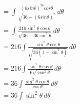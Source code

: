 \documentclass[preview]{standalone}
\begin{document}
\begin{align*}
&=\int \frac{(6sin\theta)^26cos\theta}{\sqrt{36-(6sin\theta)^2}} \, d\theta \\&=\int \frac{216\sin^2\theta\cos\theta}{\sqrt{36-36\sin^2\theta}} \, d\theta \\&=216 \int \frac{\sin^2\theta\cos\theta}{\sqrt{36(1-\sin^2\theta)}} \, d\theta \\&=216 \int \frac{\sin^2\theta\cos\theta}{6\sqrt{\cos^2\theta}} \, d\theta \\&=36 \int \frac{\sin^2\theta\cos\theta}{\cos\theta} \, d\theta \\&=36 \int \sin^2\theta \, d\theta
\end{align*}
\end{document}
